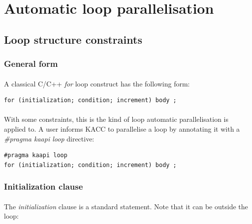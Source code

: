 \documentclass[a4paper, 11pt]{article}
\begin{document}
\newpage
\section{Automatic loop parallelisation}

\subsection{Loop structure constraints}
\subsubsection{General form}
\paragraph{}
A classical C/C++ \textit{for} loop construct has the following form:\\

\begin{small}
\lstset{language=C}
\begin{lstlisting}[frame=tb]
for (initialization; condition; increment) body ;
\end{lstlisting}
\end{small}

\paragraph{}
With some constraints, this is the kind of loop automatic parallelisation
is applied to. A user informs KACC to parallelise a loop by annotating it
with a \textit{\#pragma kaapi loop} directive:\\

\begin{small}
\lstset{language=C}
\begin{lstlisting}[frame=tb]
#pragma kaapi loop
for (initialization; condition; increment) body ;
\end{lstlisting}
\end{small}

\subsubsection{Initialization clause}
\paragraph{}
The \textit{initialization} clause is a standard statement. Note that it
can be outside the loop:\\
\end{document}
